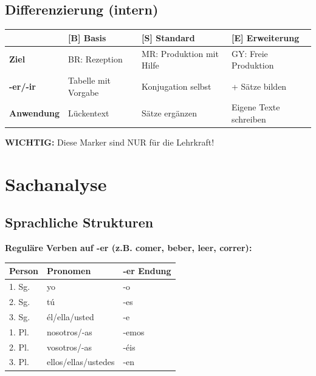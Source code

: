 \documentclass[11pt,a4paper]{article}
\newcommand{\B}{\textcolor{basis}{\textbf{[B]}}}
\newcommand{\Std}{\textcolor{standard}{\textbf{[S]}}}
\newcommand{\E}{\textcolor{erweiterung}{\textbf{[E]}}}
\begin{document}
\subsection{Differenzierung (intern)}
\begin{tabular}{|l|p{3.5cm}|p{3.5cm}|p{3.5cm}|}
\hline
& \B{} \textbf{Basis} & \Std{} \textbf{Standard} & \E{} \textbf{Erweiterung} \\
\hline
\textbf{Ziel} & BR: Rezeption & MR: Produktion mit Hilfe & GY: Freie Produktion \\
\hline
\textbf{-er/-ir} & Tabelle mit Vorgabe & Konjugation selbst & + Sätze bilden \\
\hline
\textbf{Anwendung} & Lückentext & Sätze ergänzen & Eigene Texte schreiben \\
\hline
\end{tabular}

\vspace{0.5em}
\textbf{WICHTIG:} Diese Marker sind NUR für die Lehrkraft!

\section{Sachanalyse}

\subsection{Sprachliche Strukturen}

\textbf{Reguläre Verben auf -er (z.B. comer, beber, leer, correr):}
\begin{center}
\begin{tabular}{|l|l|l|}
\hline
\textbf{Person} & \textbf{Pronomen} & \textbf{-er Endung} \\
\hline
1. Sg. & yo & -o \\
2. Sg. & tú & -es \\
3. Sg. & él/ella/usted & -e \\
1. Pl. & nosotros/-as & -emos \\
2. Pl. & vosotros/-as & -éis \\
3. Pl. & ellos/ellas/ustedes & -en \\
\hline
\end{tabular}
\end{center}
\end{document}
